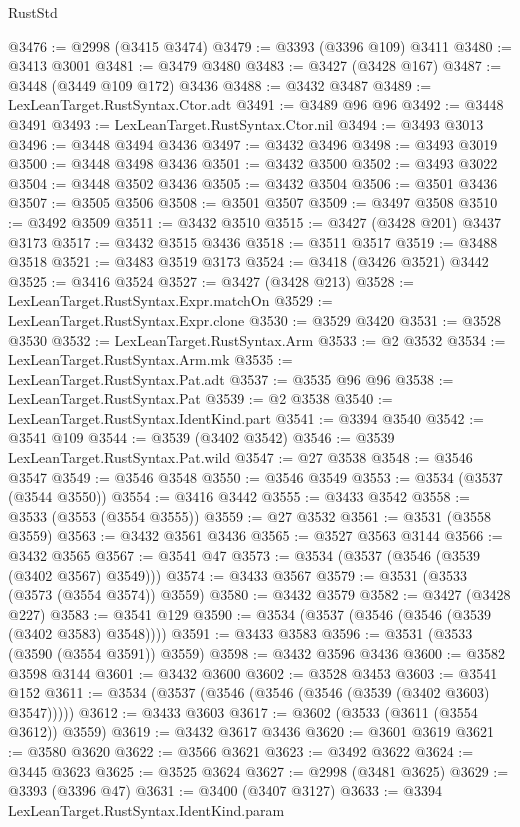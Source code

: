 \begin{lexlean}{RustStd}
\begin{coremodule}
@3476 := @2998 (@3415 @3474)
@3479 := @3393 (@3396 @109) @3411
@3480 := @3413 @3001
@3481 := @3479 @3480
@3483 := @3427 (@3428 @167)
@3487 := @3448 (@3449 @109 @172) @3436
@3488 := @3432 @3487
@3489 := LexLeanTarget.RustSyntax.Ctor.adt
@3491 := @3489 @96 @96
@3492 := @3448 @3491
@3493 := LexLeanTarget.RustSyntax.Ctor.nil
@3494 := @3493 @3013
@3496 := @3448 @3494 @3436
@3497 := @3432 @3496
@3498 := @3493 @3019
@3500 := @3448 @3498 @3436
@3501 := @3432 @3500
@3502 := @3493 @3022
@3504 := @3448 @3502 @3436
@3505 := @3432 @3504
@3506 := @3501 @3436
@3507 := @3505 @3506
@3508 := @3501 @3507
@3509 := @3497 @3508
@3510 := @3492 @3509
@3511 := @3432 @3510
@3515 := @3427 (@3428 @201) @3437 @3173
@3517 := @3432 @3515 @3436
@3518 := @3511 @3517
@3519 := @3488 @3518
@3521 := @3483 @3519 @3173
@3524 := @3418 (@3426 @3521) @3442
@3525 := @3416 @3524
@3527 := @3427 (@3428 @213)
@3528 := LexLeanTarget.RustSyntax.Expr.matchOn
@3529 := LexLeanTarget.RustSyntax.Expr.clone
@3530 := @3529 @3420
@3531 := @3528 @3530
@3532 := LexLeanTarget.RustSyntax.Arm
@3533 := @2 @3532
@3534 := LexLeanTarget.RustSyntax.Arm.mk
@3535 := LexLeanTarget.RustSyntax.Pat.adt
@3537 := @3535 @96 @96
@3538 := LexLeanTarget.RustSyntax.Pat
@3539 := @2 @3538
@3540 := LexLeanTarget.RustSyntax.IdentKind.part
@3541 := @3394 @3540
@3542 := @3541 @109
@3544 := @3539 (@3402 @3542)
@3546 := @3539 LexLeanTarget.RustSyntax.Pat.wild
@3547 := @27 @3538
@3548 := @3546 @3547
@3549 := @3546 @3548
@3550 := @3546 @3549
@3553 := @3534 (@3537 (@3544 @3550))
@3554 := @3416 @3442
@3555 := @3433 @3542
@3558 := @3533 (@3553 (@3554 @3555))
@3559 := @27 @3532
@3561 := @3531 (@3558 @3559)
@3563 := @3432 @3561 @3436
@3565 := @3527 @3563 @3144
@3566 := @3432 @3565
@3567 := @3541 @47
@3573 := @3534 (@3537 (@3546 (@3539 (@3402 @3567) @3549)))
@3574 := @3433 @3567
@3579 := @3531 (@3533 (@3573 (@3554 @3574)) @3559)
@3580 := @3432 @3579
@3582 := @3427 (@3428 @227)
@3583 := @3541 @129
@3590 := @3534 (@3537 (@3546 (@3546 (@3539 (@3402 @3583) @3548))))
@3591 := @3433 @3583
@3596 := @3531 (@3533 (@3590 (@3554 @3591)) @3559)
@3598 := @3432 @3596 @3436
@3600 := @3582 @3598 @3144
@3601 := @3432 @3600
@3602 := @3528 @3453
@3603 := @3541 @152
@3611 := @3534 (@3537 (@3546 (@3546 (@3546 (@3539 (@3402 @3603) @3547)))))
@3612 := @3433 @3603
@3617 := @3602 (@3533 (@3611 (@3554 @3612)) @3559)
@3619 := @3432 @3617 @3436
@3620 := @3601 @3619
@3621 := @3580 @3620
@3622 := @3566 @3621
@3623 := @3492 @3622
@3624 := @3445 @3623
@3625 := @3525 @3624
@3627 := @2998 (@3481 @3625)
@3629 := @3393 (@3396 @47)
@3631 := @3400 (@3407 @3127)
@3633 := @3394 LexLeanTarget.RustSyntax.IdentKind.param

\end{coremodule}
\end{lexlean}
